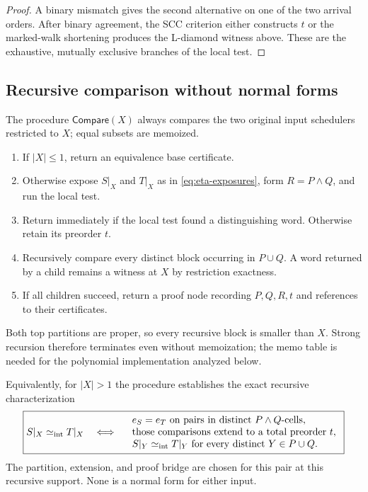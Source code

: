 \begin{proof}
A binary mismatch gives the second alternative on one of the two arrival
orders.  After binary agreement, the SCC criterion either constructs \(t\) or
the marked-walk shortening produces the L-diamond witness above.  These are
the exhaustive, mutually exclusive branches of the local test.
\end{proof}

\subsection{Recursive comparison without normal forms}

The procedure \(\mathsf{Compare}(X)\) always compares the two original input
schedulers restricted to \(X\); equal subsets are memoized.
\begin{enumerate}
\item If \(|X|\le1\), return an equivalence base certificate.
\item Otherwise expose \(S|_X\) and \(T|_X\) as in
      \autoref{eq:eta-exposures}, form \(R=P\wedge Q\), and run the local test.
\item Return immediately if the local test found a distinguishing word.
      Otherwise retain its preorder \(t\).
\item Recursively compare every distinct block occurring in \(P\cup Q\).
      A word returned by a child remains a witness at \(X\) by restriction
      exactness.
\item If all children succeed, return a proof node recording \(P,Q,R,t\) and
      references to their certificates.
\end{enumerate}
Both top partitions are proper, so every recursive block is smaller than
\(X\).  Strong recursion therefore terminates even without memoization; the
memo table is needed for the polynomial implementation analyzed below.

Equivalently, for \(|X|>1\) the procedure establishes the exact recursive
characterization
\begin{equation}
\boxed{
 S|_X\mathrel{\simeq_{\mathrm{int}}} T|_X
 \quad\Longleftrightarrow\quad
 \begin{array}{l}
 e_S=e_T\text{ on pairs in distinct }P\wedge Q\text{-cells},\\
 \text{those comparisons extend to a total preorder }t,\\
 S|_Y\mathrel{\simeq_{\mathrm{int}}} T|_Y\text{ for every distinct }Y\in P\cup Q.
 \end{array}}
\label{eq:eta-recursive-characterization}
\end{equation}
The partition, extension, and proof bridge are chosen for this pair at this
recursive support.  None is a normal form for either input.

